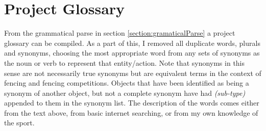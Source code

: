 \section{Project Glossary} \label{section:projectGlossary}
From the grammatical parse in section \vref{section:gramaticalParse} a project
glossary can be compiled. As a part of this, I removed all duplicate words,
plurals and synonyms, choosing the most appropriate word from any sets of synonyms as the noun or verb to represent
that entity/action. Note that synonyms in this sense are not necessarily true
synonyms but are equivalent terms in the context of fencing and fencing
competitions. Objects that have been identified as being a synonym of another
object, but not a complete synonym have had \textit{(sub-type)} appended to them
in the synonym list. The description of the words comes either from the text
above, from basic internet searching, or from my own knowledge of the sport.
